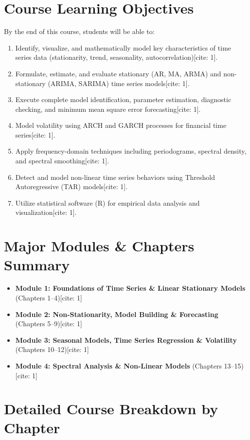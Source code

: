 \documentclass{article}
\begin{document}
\section{Course Learning Objectives}
By the end of this course, students will be able to:
\begin{enumerate}
    \item Identify, visualize, and mathematically model key characteristics of time series data (stationarity, trend, seasonality, autocorrelation)[cite: 1].
    \item Formulate, estimate, and evaluate stationary (AR, MA, ARMA) and non-stationary (ARIMA, SARIMA) time series models[cite: 1].
    \item Execute complete model identification, parameter estimation, diagnostic checking, and minimum mean square error forecasting[cite: 1].
    \item Model volatility using ARCH and GARCH processes for financial time series[cite: 1].
    \item Apply frequency-domain techniques including periodograms, spectral density, and spectral smoothing[cite: 1].
    \item Detect and model non-linear time series behaviors using Threshold Autoregressive (TAR) models[cite: 1].
    \item Utilize statistical software (R) for empirical data analysis and visualization[cite: 1].
\end{enumerate}

\section{Major Modules \& Chapters Summary}
\begin{itemize}
    \item \textbf{Module 1: Foundations of Time Series \& Linear Stationary Models} (Chapters 1--4)[cite: 1]
    \item \textbf{Module 2: Non-Stationarity, Model Building \& Forecasting} (Chapters 5--9)[cite: 1]
    \item \textbf{Module 3: Seasonal Models, Time Series Regression \& Volatility} (Chapters 10--12)[cite: 1]
    \item \textbf{Module 4: Spectral Analysis \& Non-Linear Models} (Chapters 13--15)[cite: 1]
\end{itemize}

\section{Detailed Course Breakdown by Chapter}
\end{document}
